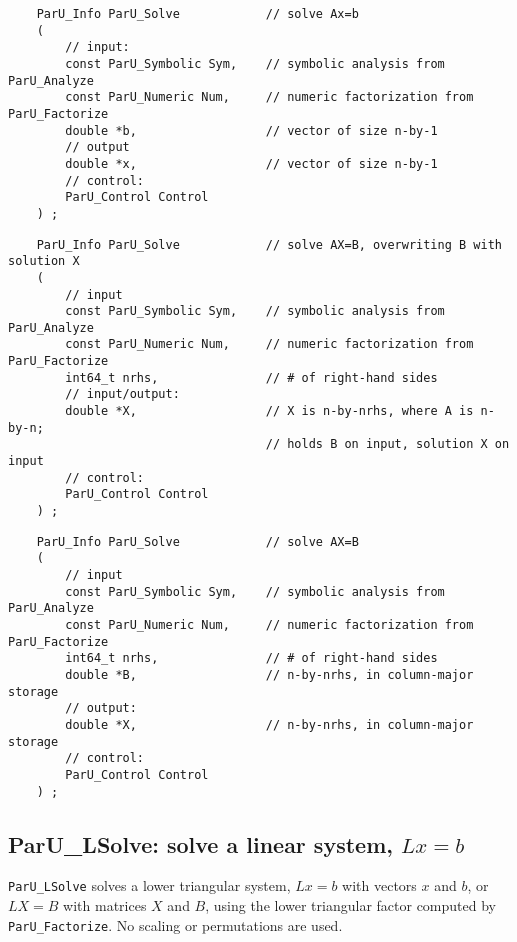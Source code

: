 \documentclass[12pt]{article}
\begin{document}
    {\footnotesize
    \begin{verbatim}
    ParU_Info ParU_Solve            // solve Ax=b
    (
        // input:
        const ParU_Symbolic Sym,    // symbolic analysis from ParU_Analyze
        const ParU_Numeric Num,     // numeric factorization from ParU_Factorize
        double *b,                  // vector of size n-by-1
        // output
        double *x,                  // vector of size n-by-1
        // control:
        ParU_Control Control
    ) ; \end{verbatim} }

    {\footnotesize
    \begin{verbatim}
    ParU_Info ParU_Solve            // solve AX=B, overwriting B with solution X
    (
        // input
        const ParU_Symbolic Sym,    // symbolic analysis from ParU_Analyze
        const ParU_Numeric Num,     // numeric factorization from ParU_Factorize
        int64_t nrhs,               // # of right-hand sides
        // input/output:
        double *X,                  // X is n-by-nrhs, where A is n-by-n;
                                    // holds B on input, solution X on input
        // control:
        ParU_Control Control
    ) ; \end{verbatim} }

    {\footnotesize
    \begin{verbatim}
    ParU_Info ParU_Solve            // solve AX=B
    (
        // input
        const ParU_Symbolic Sym,    // symbolic analysis from ParU_Analyze
        const ParU_Numeric Num,     // numeric factorization from ParU_Factorize
        int64_t nrhs,               // # of right-hand sides
        double *B,                  // n-by-nrhs, in column-major storage
        // output:
        double *X,                  // n-by-nrhs, in column-major storage
        // control:
        ParU_Control Control
    ) ; \end{verbatim} }

\subsection{{\sf ParU\_LSolve}: solve a linear system, $Lx=b$}

    \verb'ParU_LSolve' solves a lower triangular system, $Lx=b$ with vectors
    $x$ and $b$, or $LX=B$ with matrices $X$ and $B$, using the lower
    triangular factor computed by \verb'ParU_Factorize'.  No scaling or
    permutations are used.
\end{document}
